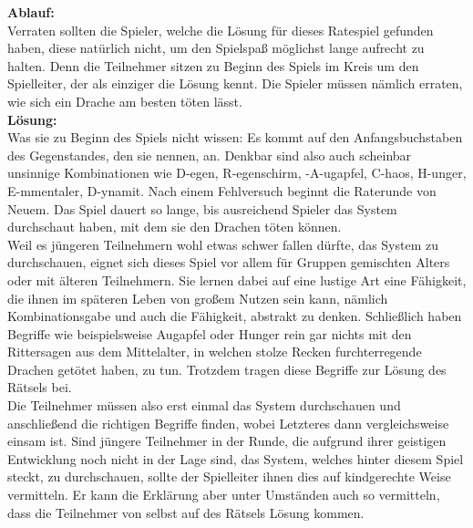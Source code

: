 \textbf{Ablauf:} \\ Verraten sollten die Spieler, welche die Lösung für dieses Ratespiel gefunden haben, diese natürlich nicht, um den Spielspaß möglichst lange aufrecht zu halten. Denn die Teilnehmer sitzen zu Beginn des Spiels im Kreis um den Spielleiter, der als einziger die Lösung kennt. Die Spieler müssen nämlich erraten, wie sich ein Drache am besten töten lässt.
\\
\textbf{Lösung:}\\Was sie zu Beginn des Spiels nicht wissen: Es kommt auf den Anfangsbuchstaben des Gegenstandes, den sie nennen, an. Denkbar sind also auch scheinbar unsinnige Kombinationen wie D-egen, R-egenschirm, -A-ugapfel, C-haos, H-unger, E-mmentaler, D-ynamit. Nach einem Fehlversuch beginnt die Raterunde von Neuem. Das Spiel dauert so lange, bis ausreichend Spieler das System durchschaut haben, mit dem sie den Drachen töten können.\\

 Weil es jüngeren Teilnehmern wohl etwas schwer fallen dürfte, das System zu durchschauen, eignet sich dieses Spiel vor allem für Gruppen gemischten Alters oder mit älteren Teilnehmern. Sie lernen dabei auf eine lustige Art eine Fähigkeit, die ihnen im späteren Leben von großem Nutzen sein kann, nämlich Kombinationsgabe und auch die Fähigkeit, abstrakt zu denken. Schließlich haben Begriffe wie beispielsweise Augapfel oder Hunger rein gar nichts mit den Rittersagen aus dem Mittelalter, in welchen stolze Recken furchterregende Drachen getötet haben, zu tun. Trotzdem tragen diese Begriffe zur Lösung des Rätsels bei.\\

    Die Teilnehmer müssen also erst einmal das System durchschauen und anschließend die richtigen Begriffe finden, wobei Letzteres dann vergleichsweise einsam ist. Sind jüngere Teilnehmer in der Runde, die aufgrund ihrer geistigen Entwicklung noch nicht in der Lage sind, das System, welches hinter diesem Spiel steckt, zu durchschauen, sollte der Spielleiter ihnen dies auf kindgerechte Weise vermitteln. Er kann die Erklärung aber unter Umständen auch so vermitteln, dass die Teilnehmer von selbst auf des Rätsels Lösung kommen.



